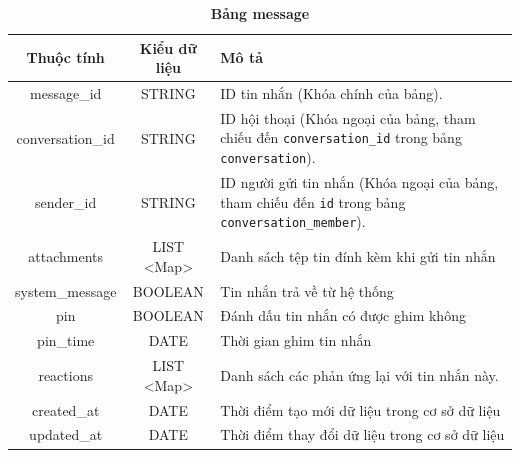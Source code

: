 \begin{table}[H]
  \caption{\bfseries \fontsize{12pt}{0pt}\selectfont Bảng message}
  \centering
  \begin{tabularx}{0.9\textwidth}{|c|c|X|}
    \hline
    \textbf{Thuộc tính} & \textbf{Kiểu dữ liệu} & \textbf{Mô tả} \\
    \hline
    message\_id & STRING & ID tin nhắn (Khóa chính của bảng). \\
    \hline
    conversation\_id & STRING & ID hội thoại (Khóa ngoại của bảng, tham chiếu đến \texttt{conversation\_id} trong bảng \texttt{conversation}). \\
    \hline
    sender\_id & STRING & ID người gửi tin nhắn (Khóa ngoại của bảng, tham chiếu đến \texttt{id} trong bảng \texttt{conversation\_member}). \\
    \hline
    attachments & LIST <Map> & Danh sách tệp tin đính kèm khi gửi tin nhắn\\
    \hline
    system\_message & BOOLEAN & Tin nhắn trả về từ hệ thống\\
    \hline
    pin & BOOLEAN & Đánh dấu tin nhắn có được ghim không\\
    \hline
    pin\_time & DATE & Thời gian ghim tin nhắn\\
    \hline
    reactions & LIST <Map> & Danh sách các phản ứng lại với tin nhắn này.\\
    \hline
    created\_at & DATE & Thời điểm tạo mới dữ liệu trong cơ sở dữ liệu \\
    \hline
    updated\_at & DATE & Thời điểm thay đổi dữ liệu trong cơ sở dữ liệu \\
    \hline
  \end{tabularx}
\end{table}

